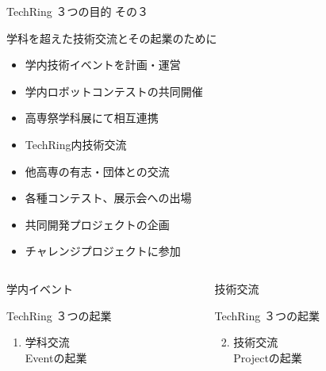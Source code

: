 \documentclass[dvipdfmx]{beamer}
\begin{document}
\begin{frame}{TechRing ３つの目的 その３}
  \begin{greyblock}{学科を超えた技術交流とその起業のために}
    \vspace{1mm}
    \begin{footnotesize}
      \begin{itemize}
        \item 学内技術イベントを計画・運営
        \item 学内ロボットコンテストの共同開催
        \item 高専祭学科展にて相互連携
        \item TechRing内技術交流
        \item 他高専の有志・団体との交流
        \item \alert{各種コンテスト、展示会への出場}
        \item \alert{共同開発プロジェクトの企画}
        \item \alert{チャレンジプロジェクトに参加}
      \end{itemize}
    \end{footnotesize}
  \end{greyblock}

  \begin{columns}
    \begin{column}{0.30\textwidth}
      \begin{block}{学内イベント}
        \begin{footnotesize}
          TechRing ３つの起業
          \begin{enumerate}
            \item 学科交流\\Eventの起業
          \end{enumerate}
        \end{footnotesize}
      \end{block}
    \end{column}

    \begin{column}{0.30\textwidth}
      \begin{block}{技術交流}
        \begin{footnotesize}
          TechRing ３つの起業
          \begin{enumerate}
            \setcounter{enumi}{1}
            \item 技術交流\\Projectの起業
          \end{enumerate}
        \end{footnotesize}
      \end{block}
    \end{column}


\end{columns}
\end{frame}
\end{document}
